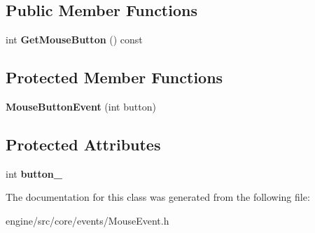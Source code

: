 \subsection*{Public Member Functions}
\begin{DoxyCompactItemize}
\item 
\mbox{\label{classengine_1_1events_1_1MouseButtonEvent_ad6e5db5a8f746d3e0da996246f4df035}} 
int {\bfseries Get\+Mouse\+Button} () const
\end{DoxyCompactItemize}
\subsection*{Protected Member Functions}
\begin{DoxyCompactItemize}
\item 
\mbox{\label{classengine_1_1events_1_1MouseButtonEvent_af3ccd7fa769f0a383896c0d8faaca8a1}} 
{\bfseries Mouse\+Button\+Event} (int button)
\end{DoxyCompactItemize}
\subsection*{Protected Attributes}
\begin{DoxyCompactItemize}
\item 
\mbox{\label{classengine_1_1events_1_1MouseButtonEvent_ac8f03e2926022023b87a713cb44e85b7}} 
int {\bfseries button\+\_\+}
\end{DoxyCompactItemize}


The documentation for this class was generated from the following file\+:\begin{DoxyCompactItemize}
\item 
engine/src/core/events/Mouse\+Event.\+h\end{DoxyCompactItemize}
